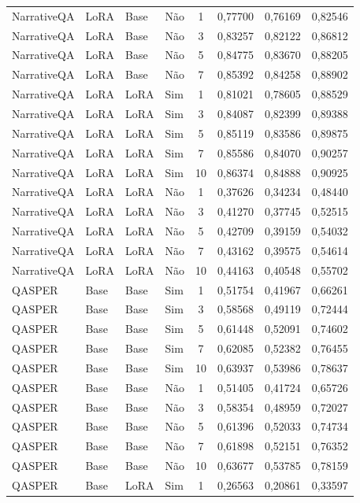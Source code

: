 \begin{longtable}{llllcccc}
NarrativeQA & LoRA & Base & Não & 1 & 0,77700 & 0,76169 & 0,82546 \\
NarrativeQA & LoRA & Base & Não & 3 & 0,83257 & 0,82122 & 0,86812 \\
NarrativeQA & LoRA & Base & Não & 5 & 0,84775 & 0,83670 & 0,88205 \\
NarrativeQA & LoRA & Base & Não & 7 & 0,85392 & 0,84258 & 0,88902 \\
NarrativeQA & LoRA & LoRA & Sim & 1 & 0,81021 & 0,78605 & 0,88529 \\
NarrativeQA & LoRA & LoRA & Sim & 3 & 0,84087 & 0,82399 & 0,89388 \\
NarrativeQA & LoRA & LoRA & Sim & 5 & 0,85119 & 0,83586 & 0,89875 \\
NarrativeQA & LoRA & LoRA & Sim & 7 & 0,85586 & 0,84070 & 0,90257 \\
NarrativeQA & LoRA & LoRA & Sim & 10 & 0,86374 & 0,84888 & 0,90925 \\
NarrativeQA & LoRA & LoRA & Não & 1 & 0,37626 & 0,34234 & 0,48440 \\
NarrativeQA & LoRA & LoRA & Não & 3 & 0,41270 & 0,37745 & 0,52515 \\
NarrativeQA & LoRA & LoRA & Não & 5 & 0,42709 & 0,39159 & 0,54032 \\
NarrativeQA & LoRA & LoRA & Não & 7 & 0,43162 & 0,39575 & 0,54614 \\
NarrativeQA & LoRA & LoRA & Não & 10 & 0,44163 & 0,40548 & 0,55702 \\
QASPER & Base & Base & Sim & 1 & 0,51754 & 0,41967 & 0,66261 \\
QASPER & Base & Base & Sim & 3 & 0,58568 & 0,49119 & 0,72444 \\
QASPER & Base & Base & Sim & 5 & 0,61448 & 0,52091 & 0,74602 \\
QASPER & Base & Base & Sim & 7 & 0,62085 & 0,52382 & 0,76455 \\
QASPER & Base & Base & Sim & 10 & 0,63937 & 0,53986 & 0,78637 \\
QASPER & Base & Base & Não & 1 & 0,51405 & 0,41724 & 0,65726 \\
QASPER & Base & Base & Não & 3 & 0,58354 & 0,48959 & 0,72027 \\
QASPER & Base & Base & Não & 5 & 0,61396 & 0,52033 & 0,74734 \\
QASPER & Base & Base & Não & 7 & 0,61898 & 0,52151 & 0,76352 \\
QASPER & Base & Base & Não & 10 & 0,63677 & 0,53785 & 0,78159 \\
QASPER & Base & LoRA & Sim & 1 & 0,26563 & 0,20861 & 0,33597 \\

\end{longtable}
